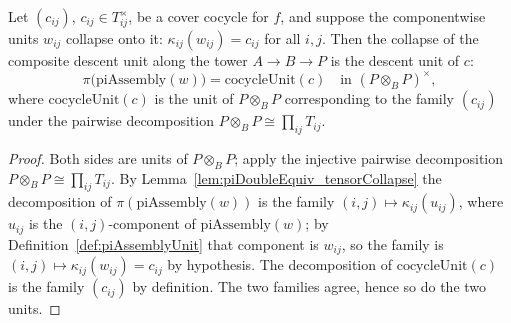 \begin{theorem}
  \label{thm:tensorCollapse_piAssemblyUnit}
  \leanok
  Let \((c_{ij})\), \(c_{ij} \in T_{ij}^{\times}\), be a cover cocycle for \(f\), and suppose
  the componentwise units \(w_{ij}\) collapse onto it: \(\kappa_{ij}(w_{ij}) = c_{ij}\) for
  all \(i, j\). Then the collapse of the composite descent unit along the tower
  \(A \to B \to P\) is the descent unit of \(c\):
  \[
    \pi\bigl(\mathrm{piAssembly}(w)\bigr) = \mathrm{cocycleUnit}(c)
    \quad\text{in } (P \otimes_B P)^{\times},
  \]
  where \(\mathrm{cocycleUnit}(c)\) is the unit of \(P \otimes_B P\) corresponding to the
  family \((c_{ij})\) under the pairwise decomposition
  \(P \otimes_B P \cong \prod_{ij} T_{ij}\).
\end{theorem}
\begin{proof}
  \leanok
  Both sides are units of \(P \otimes_B P\); apply the injective pairwise decomposition
  \(P \otimes_B P \cong \prod_{ij} T_{ij}\). By Lemma~\ref{lem:piDoubleEquiv_tensorCollapse}
  the decomposition of \(\pi(\mathrm{piAssembly}(w))\) is the family
  \((i,j) \mapsto \kappa_{ij}(u_{ij})\), where \(u_{ij}\) is the \((i,j)\)-component of
  \(\mathrm{piAssembly}(w)\); by Definition~\ref{def:piAssemblyUnit} that component is
  \(w_{ij}\), so the family is \((i,j) \mapsto \kappa_{ij}(w_{ij}) = c_{ij}\) by hypothesis.
  The decomposition of \(\mathrm{cocycleUnit}(c)\) is the family \((c_{ij})\) by definition.
  The two families agree, hence so do the two units.
\end{proof}


